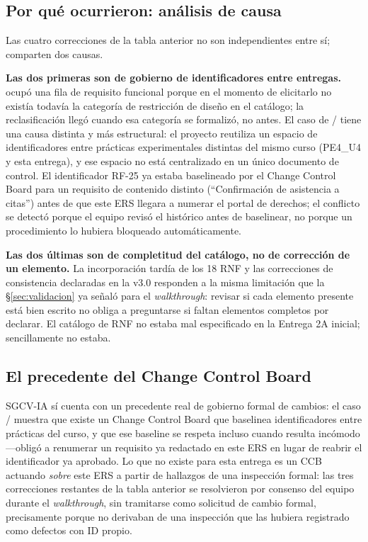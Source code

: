 \subsection{Por qué ocurrieron: análisis de causa}
 
Las cuatro correcciones de la tabla anterior no son independientes entre sí; comparten dos causas.
 
\textbf{Las dos primeras son de gobierno de identificadores entre entregas.}  ocupó una
fila de requisito funcional porque en el momento de elicitarlo no existía todavía la categoría de
restricción de diseño en el catálogo; la reclasificación llegó cuando esa categoría se formalizó, no
antes. El caso de / tiene una causa distinta y más estructural: el proyecto
reutiliza un espacio de identificadores entre prácticas experimentales distintas del mismo curso
(PE4\_U4 y esta entrega), y ese espacio no está centralizado en un único documento de control. El
identificador RF-25 ya estaba baselineado por el Change Control Board para un requisito de contenido
distinto (``Confirmación de asistencia a citas'') antes de que este ERS llegara a numerar el portal
de derechos; el conflicto se detectó porque el equipo revisó el histórico antes de baselinear, no
porque un procedimiento lo hubiera bloqueado automáticamente.
 
\textbf{Las dos últimas son de completitud del catálogo, no de corrección de un elemento.} La
incorporación tardía de los 18 RNF y las correcciones de consistencia declaradas en la v3.0 responden
a la misma limitación que la \S\ref{sec:validacion} ya señaló para el \emph{walkthrough}: revisar si
cada elemento presente está bien escrito no obliga a preguntarse si faltan elementos completos por
declarar. El catálogo de RNF no estaba mal especificado en la Entrega 2A inicial; sencillamente no
estaba.
 
\subsection{El precedente del Change Control Board}
 
SGCV-IA sí cuenta con un precedente real de gobierno formal de cambios: el caso /
muestra que existe un Change Control Board que baselinea identificadores entre prácticas del curso, y
que ese baseline se respeta incluso cuando resulta incómodo ---obligó a renumerar un requisito ya
redactado en este ERS en lugar de reabrir el identificador ya aprobado. Lo que no existe para esta
entrega es un CCB actuando \emph{sobre} este ERS a partir de hallazgos de una inspección formal: las
tres correcciones restantes de la tabla anterior se resolvieron por consenso del equipo durante el
\emph{walkthrough}, sin tramitarse como solicitud de cambio formal, precisamente porque no derivaban
de una inspección que las hubiera registrado como defectos con ID propio.
 
